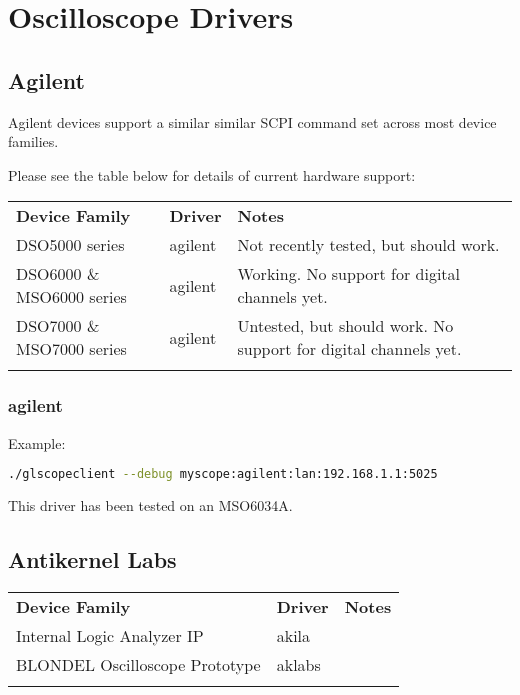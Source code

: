 \section{Oscilloscope Drivers}
\label{sec:drivers}

\subsection{Agilent}

Agilent devices support a similar similar SCPI command set across most device families.

Please see the table below for details of current hardware support:

\begin{tabularx}{16cm}{llX}
\thickhline
\textbf{Device Family} & \textbf{Driver} & \textbf{Notes} \\
\thickhline
DSO5000 series & agilent & Not recently tested, but should work.\\
\thickhline
DSO6000 \& MSO6000 series & agilent &  Working. No support for digital channels yet.\\
\thickhline
DSO7000 \& MSO7000 series & agilent &  Untested, but should work. No support for digital channels yet.\\
\thickhline
\end{tabularx}

\subsubsection{agilent}

Example:
\begin{lstlisting}[language=sh]
./glscopeclient --debug myscope:agilent:lan:192.168.1.1:5025
\end{lstlisting}

This driver has been tested on an MSO6034A.

\subsection{Antikernel Labs}

\begin{tabularx}{16cm}{llX}
\thickhline
\textbf{Device Family} & \textbf{Driver} & \textbf{Notes} \\
\thickhline
Internal Logic Analyzer IP & akila & \\
\thickhline
BLONDEL Oscilloscope Prototype & aklabs & \\
\thickhline
\end{tabularx}

